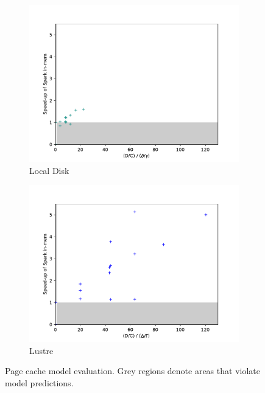 \begin{figure}
\begin{subfigure}{0.5\linewidth}
\centering
    \includegraphics[width=\textwidth]{figures/part2-chp1/local-incrementation.pdf}
\caption{Local Disk}
\label{fig:modeleval-local}
    \end{subfigure}%
\begin{subfigure}{0.5\linewidth}
\centering
    \includegraphics[width=\textwidth]{figures/part2-chp1/lustre-incrementation.pdf}
\caption{Lustre}
\label{fig:modeleval-lustre}
\end{subfigure}
\setlength{\belowcaptionskip}{-10pt}
    \caption{Page cache model evaluation. Grey 
             regions denote areas that violate model predictions.}
\label{fig:modeleval}
\end{figure}

